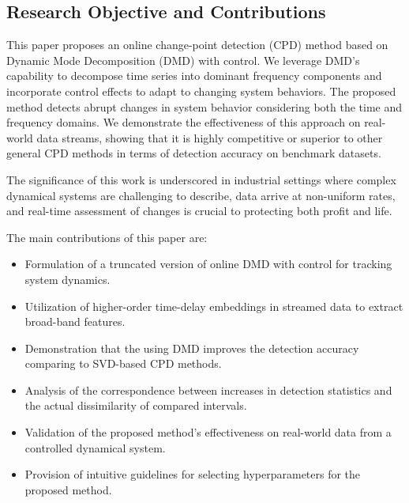 \subsection{Research Objective and Contributions}
This paper proposes an online change-point detection (CPD) method based on Dynamic Mode Decomposition (DMD) with control. We leverage DMD's capability to decompose time series into dominant frequency components and incorporate control effects to adapt to changing system behaviors. The proposed method detects abrupt changes in system behavior considering both the time and frequency domains. We demonstrate the effectiveness of this approach on real-world data streams, showing that it is highly competitive or superior to other general CPD methods in terms of detection accuracy on benchmark datasets.

The significance of this work is underscored in industrial settings where complex dynamical systems are challenging to describe, data arrive at non-uniform rates, and real-time assessment of changes is crucial to protecting both profit and life.

The main contributions of this paper are:
\begin{itemize}
    \item Formulation of a truncated version of online DMD with control for tracking system dynamics.
    \item Utilization of higher-order time-delay embeddings in streamed data to extract broad-band features.
    \item Demonstration that the using DMD improves the detection accuracy comparing to SVD-based CPD methods.
    \item Analysis of the correspondence between increases in detection statistics and the actual dissimilarity of compared intervals.
    \item Validation of the proposed method's effectiveness on real-world data from a controlled dynamical system.
    \item Provision of intuitive guidelines for selecting hyperparameters for the proposed method.
\end{itemize}
